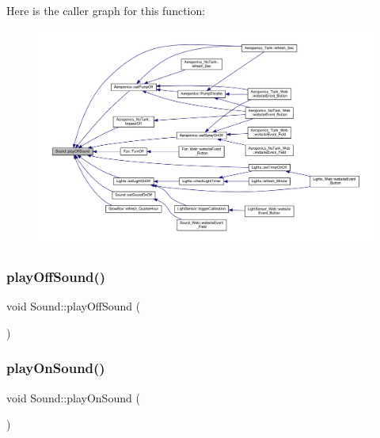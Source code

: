 Here is the caller graph for this function\+:
\nopagebreak
\begin{figure}[H]
\begin{center}
\leavevmode
\includegraphics[width=350pt]{class_sound_a53aa4bec2fd464c5149ca30b29b35ac1_icgraph}
\end{center}
\end{figure}
\mbox{\label{class_sound_a53aa4bec2fd464c5149ca30b29b35ac1}} 
\subsubsection{\texorpdfstring{play\+Off\+Sound()}{playOffSound()}\hspace{0.1cm}{\footnotesize\ttfamily [2/2]}}
{\footnotesize\ttfamily void Sound\+::play\+Off\+Sound (\begin{DoxyParamCaption}{ }\end{DoxyParamCaption})}

\mbox{\label{class_sound_a038f9173934d27db8004ded6db667df6}} 
\subsubsection{\texorpdfstring{play\+On\+Sound()}{playOnSound()}\hspace{0.1cm}{\footnotesize\ttfamily [1/2]}}
{\footnotesize\ttfamily void Sound\+::play\+On\+Sound (\begin{DoxyParamCaption}{ }\end{DoxyParamCaption})}


